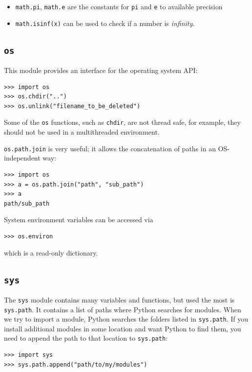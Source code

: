 \documentclass[justified, sixbynine]{tufte-book}
\def\ft{\small\tt}
\theoremstyle{plain}%
\newtheorem * {corollary}{Corollary}
\theoremstyle{definition}
\theoremstyle{remark}
\newtheorem * {remark}{Remark}
\newtheorem * {note}{Note}
\begin{document}
\begin{fullwidth}
\begin{itemize}
\item {\ft math.pi}, {\ft math.e} are the constants for {\ft pi} and {\ft e} to available precision

\item {\ft math.isinf(x)} can be used to check if a number is {\it infinity}.
\end{itemize}



\goodbreak\subsection{{\ft os}}

  

This module provides an interface for the operating system API:
\begin{lstlisting}
>>> import os
>>> os.chdir("..")
>>> os.unlink("filename_to_be_deleted")
\end{lstlisting}

Some of the {\ft os} functions, such as {\ft chdir}, are not thread safe, for example, they should not be used in a multithreaded environment.

{\ft os.path.join} is very useful; it allows the concatenation of paths in an OS-independent way:
\begin{lstlisting}
>>> import os
>>> a = os.path.join("path", "sub_path")
>>> a
path/sub_path
\end{lstlisting}

System environment variables can be accessed via
\begin{lstlisting}
>>> os.environ
\end{lstlisting}
\noindent which is a read-only dictionary.

\goodbreak\subsection{{\ft sys}}

 

The {\ft sys} module contains many variables and functions, but used the most is {\ft sys.path}. It contains a list of paths where Python searches for modules. When we try to import a module, Python searches the folders listed in {\ft sys.path}. If you install additional modules in some location and want Python to find them, you need to append the path to that location to {\ft sys.path}:
\begin{lstlisting}
>>> import sys
>>> sys.path.append("path/to/my/modules")
\end{lstlisting}


\end{fullwidth}
\end{document}
